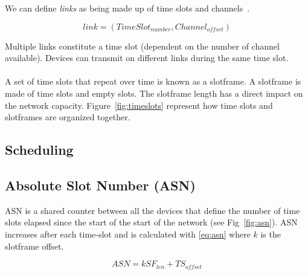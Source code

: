 We can define \emph{links} as being made up of time slots and
channels~\cite{Chen2013PerformanceAO}.

\begin{equation}
  \label{eq:links}
  link = (TimeSlot_{number}, Channel_{offset})
\end{equation}

Multiple links constitute a time slot (dependent on the number of channel
available). Devices can transmit on different links during the same time slot.

\paragraph{}

A set of time slots that repeat over time is known as a slotframe.
A slotframe is made of time slots and empty slots.
The slotframe length has a direct impact on the network capacity.
Figure~\ref{fig:timeslots} represent how time slots and slotframes are
organized together. 



\subsection{Scheduling}

\subsection{Absolute Slot Number (ASN)}

ASN is a shared counter between all the devices that define the number of time slots 
elapsed since the start of the start of the network (see Fig~\ref{fig:asn}).
ASN increases after each time-slot and is calculated with \ref{eq:asn} where $k$
is the slotframe offset.

\begin{equation}
  \label{eq:asn}
  ASN = k SF_{len} + TS_{offset}
\end{equation}

